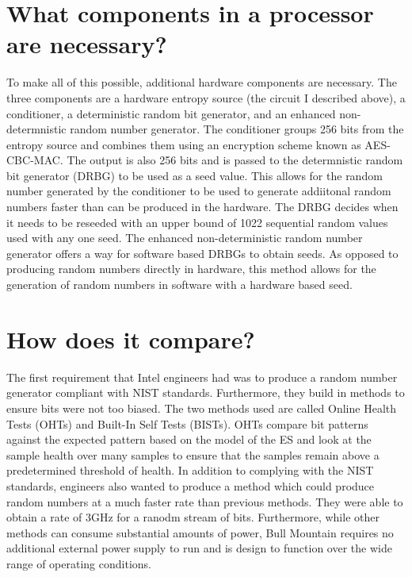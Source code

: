 \documentclass[fontsize=12pt]{article}
\numberwithin{equation}{section} %
\numberwithin{figure}{section} %
\numberwithin{table}{section} %
\begin{document}
\section{What components in a processor are necessary?}
To make all of this possible, additional hardware components are necessary.
The three components are a hardware entropy source (the circuit I described
above), a conditioner, a deterministic random bit generator, and an enhanced
non-determnistic random number generator.  The conditioner groups 256 bits from
the entropy source and combines them using an encryption scheme known as
AES-CBC-MAC.  The output is also 256 bits and is passed to the determnistic
random bit generator (DRBG) to be used as a seed value. This allows for the
random number generated by the conditioner to be used to generate addiitonal
random numbers faster than can be produced in the hardware.  The DRBG decides
when it needs to be reseeded with an upper bound of 1022 sequential random
values used with any one seed.  The enhanced non-deterministic random number
generator offers a way for software based DRBGs to obtain seeds.  As opposed to
producing random numbers directly in hardware, this method allows for the
generation of random numbers in software with a hardware based seed.
\section{How does it compare?}
The first requirement that Intel engineers had was to produce a random number
generator compliant with NIST standards.  Furthermore, they build in methods to
ensure bits were not too biased.  The two methods used are called Online Health
Tests (OHTs) and Built-In Self Tests (BISTs).  OHTs compare bit patterns
against the expected pattern based on the model of the ES and look at the
sample health over many samples to ensure that the samples remain above a
predetermined threshold of health.  In addition to complying with the NIST
standards, engineers also wanted to produce a method which could produce random
numbers at a much faster rate than previous methods.  They were able to obtain
a rate of 3GHz for a ranodm stream of bits.  Furthermore, while other methods
can consume substantial amounts of power, Bull Mountain requires no additional
external power supply to run and is design to function over the wide range of
operating conditions.
\end{document}
